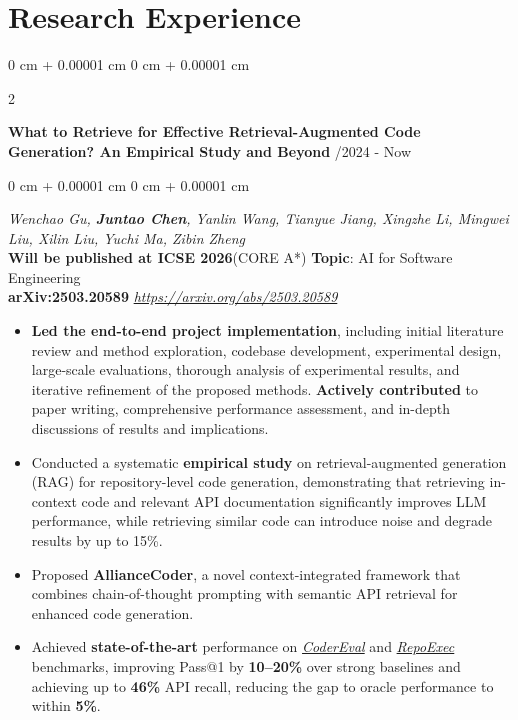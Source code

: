 \documentclass[10pt, letterpaper]{article}
\newenvironment{highlights}{
    \begin{itemize}[
        topsep=0.10 cm,
        parsep=0.10 cm,
        partopsep=0pt,
        itemsep=0pt,
        leftmargin=0 cm + 10pt
    ]
}{
    \end{itemize}
} %
\newenvironment{onecolentry}{
    \begin{adjustwidth}{
        0 cm + 0.00001 cm
    }{
        0 cm + 0.00001 cm
    }
}{
    \end{adjustwidth}
} %
\newenvironment{twocolentry}[2][]{
    \onecolentry
    \def\secondColumn{#2}
    \setcolumnwidth{\fill, 4.5 cm}
    \begin{paracol}{2}
}{
    \switchcolumn \raggedleft \secondColumn
    \end{paracol}
    \endonecolentry
} %
\begin{document}
\section{Research Experience}

\begin{twocolentry}{
            07/2024 - Now
        }
            \textbf{What to Retrieve for Effective Retrieval-Augmented Code
Generation? An Empirical Study and Beyond}\end{twocolentry}

        \vspace{0.10 cm}
        \begin{onecolentry}
       \textit{{\small Wenchao Gu, \textbf{Juntao Chen}, Yanlin Wang, Tianyue Jiang, Xingzhe Li, Mingwei Liu, Xilin Liu, Yuchi Ma, Zibin Zheng}}\\
\textbf{Will be published at ICSE 2026}(CORE A*)           \textbf{Topic}: AI for Software Engineering  \\ \textbf{arXiv:2503.20589}
\href{https://arxiv.org/abs/2503.20589}{\textit{https://arxiv.org/abs/2503.20589}}
 

        \begin{highlights}
            \item \textbf{Led the end-to-end project implementation},  including initial literature review and method exploration, codebase development, experimental design, large-scale evaluations, thorough analysis of experimental results, and iterative refinement of the proposed methods. \textbf{Actively contributed} to paper writing, comprehensive performance assessment, and in-depth discussions of results and implications.
            \item Conducted a systematic \textbf{empirical study} on retrieval-augmented generation (RAG) for repository-level code generation, demonstrating that retrieving in-context code and relevant API documentation significantly improves LLM performance, while retrieving similar code can introduce noise and degrade results by up to 15\%.
            \item Proposed \textbf{AllianceCoder}, a novel context-integrated framework that combines chain-of-thought prompting with semantic API retrieval for enhanced code generation.
            \item Achieved \textbf{state-of-the-art} performance on \href{https://github.com/CoderEval/CoderEval}{\textit{CoderEval}} and \href{https://github.com/FSoft-AI4Code/RepoExec}{\textit{RepoExec}} benchmarks, improving Pass@1 by \textbf{10–20\%} over strong baselines and achieving up to \textbf{46\%} API recall, reducing the gap to oracle performance to within \textbf{5\%}.
        \end{highlights}
           
        \end{onecolentry}
\end{document}
